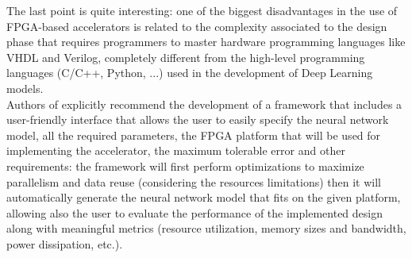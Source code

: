\documentclass[11pt,a4paper]{article}
\begin{document}
The last point is quite interesting: one of the biggest disadvantages in the use of FPGA-based accelerators is related to the complexity associated to the design phase that requires programmers to master hardware programming languages like VHDL and Verilog, completely different from the high-level programming languages (C/C++, Python, ...) used in the development of Deep Learning models.\\
Authors of \cite{shawahna_review_2019} explicitly recommend the development of a framework that includes a user-friendly interface that allows the user to easily specify the neural network model, all the required parameters, the FPGA platform that will be used for implementing the accelerator, the maximum tolerable error and other requirements: the framework will first perform optimizations to maximize parallelism and data reuse (considering the resources limitations) then it will automatically generate the neural network model that fits on the given platform, allowing also the user to evaluate the performance of the implemented design along with meaningful metrics (resource utilization, memory sizes and bandwidth, power dissipation, etc.).
\end{document}
